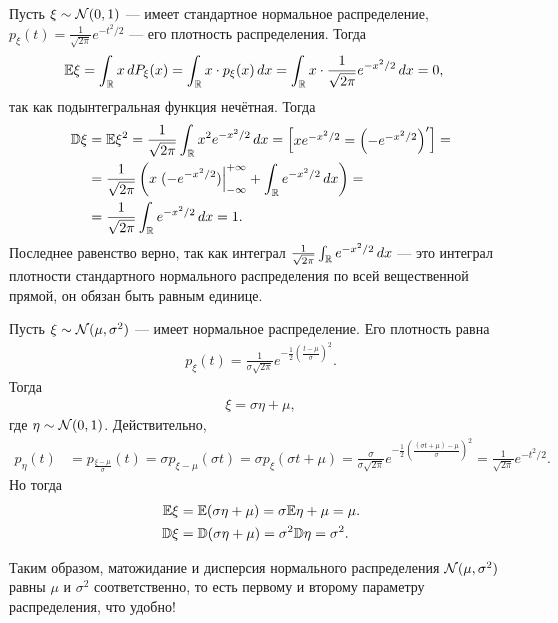 \documentclass[../main.tex]{subfiles}
\begin{document}
  \begin{exmpl}
   Пусть $ \xi \sim \mathcal N(0,1) $ --- имеет стандартное нормальное распределение,  $ p_\xi(t) = \frac{1}{\sqrt{2\pi}}e^{-t^{2} / 2} $ --- его плотность распределения. Тогда
   \begin{align*}
    \mathbb E\xi &= \int_{\mathbb{R}} x\,dP_\xi(x) = \int_{\mathbb{R}} x \cdot p_\xi(x)\,dx = \int_{\mathbb{R}} x \cdot \frac{1}{\sqrt{2\pi}}      e^{-x^{2} / 2}\,dx = 0,
   \end{align*} так как подынтегральная функция нечётная. Тогда
   \begin{align*}
    \mathbb D\xi &= \mathbb E\xi^{2} = \frac{1}{\sqrt{2\pi}}\int_{\mathbb{R}} x^{2} e^{-x^{2} / 2}\,dx = \begin{bmatrix}
     xe^{-x^{2} / 2} = \left( -e^{-x^{2} / 2} \right)'
    \end{bmatrix} = \\
    &= \frac{1}{\sqrt{2\pi}} \left( x \left.(-e^{-x^{2} / 2})\right|_{-\infty}^{+\infty} + \int_{\mathbb{R}} e^{-x^{2} / 2}\,dx  \right) = \\
     &= \frac{1}{\sqrt{2\pi}} \int_{\mathbb{R}} e^{-x^{2} / 2} \,dx = 1.
    \end{align*} Последнее равенство верно, так как интеграл $ \frac{1}{\sqrt{2\pi}} \int_{\mathbb{R}} e^{-x^{2} / 2}\,dx  $ --- это интеграл плотности стандартного нормального распределения по всей вещественной прямой, он обязан быть равным единице.
   \end{exmpl}

   \begin{exmpl}
    Пусть $ \xi \sim \mathcal N(\mu,\sigma^{2}) $ --- имеет нормальное распределение. Его плотность равна
    \begin{align*}
     p_\xi(t) = \frac{1}{\sigma\sqrt{2\pi}} e^{-\frac{1}{2} \left( \frac{t-\mu}{\sigma} \right)^{2}}.
     \end{align*} Тогда \begin{align*}
     \xi = \sigma \eta + \mu,
    \end{align*} где $ \eta \sim \mathcal N(0,1) $. Действительно,
    \begin{align*}
     p_\eta(t) &= p_{\frac{\xi - \mu}{\sigma}}(t) = \sigma p_{\xi - \mu}(\sigma t) = \sigma p_\xi(\sigma t + \mu) = \frac{\sigma}{\sigma \sqrt{2\pi}} e^{-\frac{1}{2} \left( \frac{(\sigma t + \mu) - \mu}{\sigma} \right)^{2}} = \frac{1}{\sqrt{2\pi}}e^{-t^{2} / 2}.
    \end{align*} Но тогда
    \begin{align*}
     \mathbb E\xi &= \mathbb E(\sigma \eta + \mu)  = \sigma \mathbb E\eta + \mu = \mu.\\
     \mathbb D\xi &= \mathbb D(\sigma\eta + \mu) = \sigma^{2}\mathbb D\eta = \sigma^{2}.
    \end{align*} 

    Таким образом, матожидание и дисперсия нормального распределения $ \mathcal N(\mu, \sigma^{2}) $ равны $ \mu $ и $ \sigma^{2} $ соответственно, то есть первому и второму параметру распределения, что удобно!
   \end{exmpl}
\end{document}

